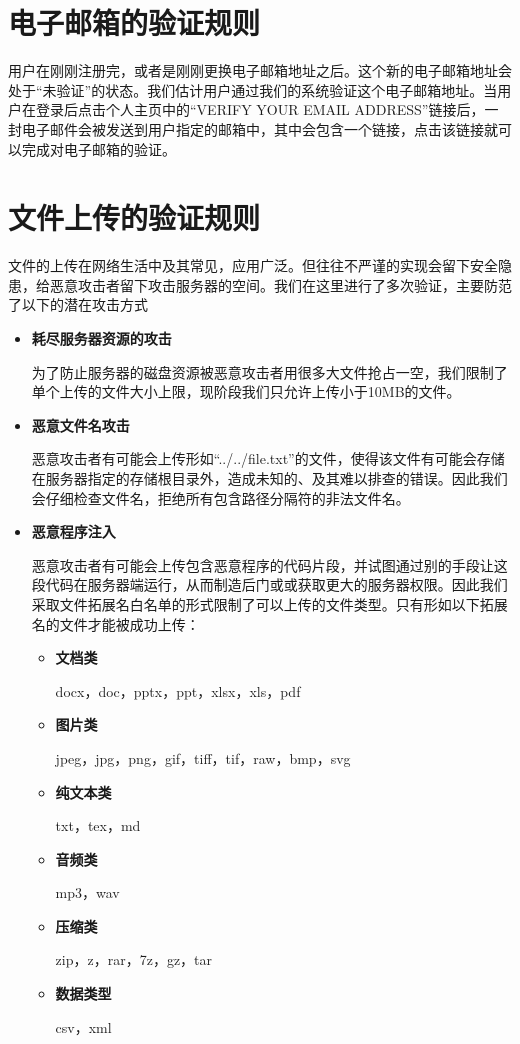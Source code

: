 \section{电子邮箱的验证规则}\label{sec:emailV}

用户在刚刚注册完，或者是刚刚更换电子邮箱地址之后。这个新的电子邮箱地址会处于“未验证”的状态。我们估计用户通过我们的系统验证这个电子邮箱地址。当用户在登录后点击个人主页中的“VERIFY YOUR EMAIL ADDRESS”链接后，一封电子邮件会被发送到用户指定的邮箱中，其中会包含一个链接，点击该链接就可以完成对电子邮箱的验证。

\section{文件上传的验证规则}\label{sec:fileV}

文件的上传在网络生活中及其常见，应用广泛。但往往不严谨的实现会留下安全隐患，给恶意攻击者留下攻击服务器的空间。我们在这里进行了多次验证，主要防范了以下的潜在攻击方式
\begin{itemize}

	\item \textbf{耗尽服务器资源的攻击}
	
	为了防止服务器的磁盘资源被恶意攻击者用很多大文件抢占一空，我们限制了单个上传的文件大小上限，现阶段我们只允许上传小于10MB的文件。
	
	\item \textbf{恶意文件名攻击}
	
	恶意攻击者有可能会上传形如“../../file.txt”的文件，使得该文件有可能会存储在服务器指定的存储根目录外，造成未知的、及其难以排查的错误。因此我们会仔细检查文件名，拒绝所有包含路径分隔符的非法文件名。
	
	\item \textbf{恶意程序注入}
	
	恶意攻击者有可能会上传包含恶意程序的代码片段，并试图通过别的手段让这段代码在服务器端运行，从而制造后门或或获取更大的服务器权限。因此我们采取文件拓展名白名单的形式限制了可以上传的文件类型。只有形如以下拓展名的文件才能被成功上传：
	\begin{itemize}
		\item \textbf{文档类}
		
		docx，doc，pptx，ppt，xlsx，xls，pdf
		
		\item \textbf{图片类}
		
		jpeg，jpg，png，gif，tiff，tif，raw，bmp，svg
		
		\item \textbf{纯文本类}
		
		txt，tex，md
		
		\item \textbf{音频类}
		
		mp3，wav
		
		\item \textbf{压缩类}
		
		zip，z，rar，7z，gz，tar
		
		\item \textbf{数据类型}
		
		csv，xml
	\end{itemize}

\end{itemize}

